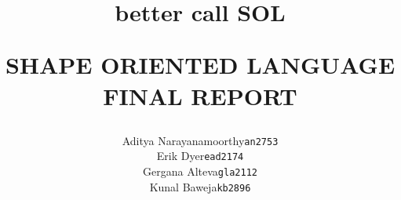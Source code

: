 \documentclass[letterpaper,12pt]{article}
\begin{document}

\title{{\small better call} {\Huge \textbf{SOL}}\\
    \begin{center}{SHAPE ORIENTED LANGUAGE FINAL REPORT}\end{center}
}

\author{
  \begin{tabular}{ lc lc }
    Aditya Narayanamoorthy & \texttt{an2753}  \\
    Erik Dyer              & \texttt{ead2174} \\
    Gergana Alteva         & \texttt{gla2112} \\
    Kunal Baweja           & \texttt{kb2896}
  \end{tabular}
}

\maketitle

\tableofcontents{}


\end{document}
